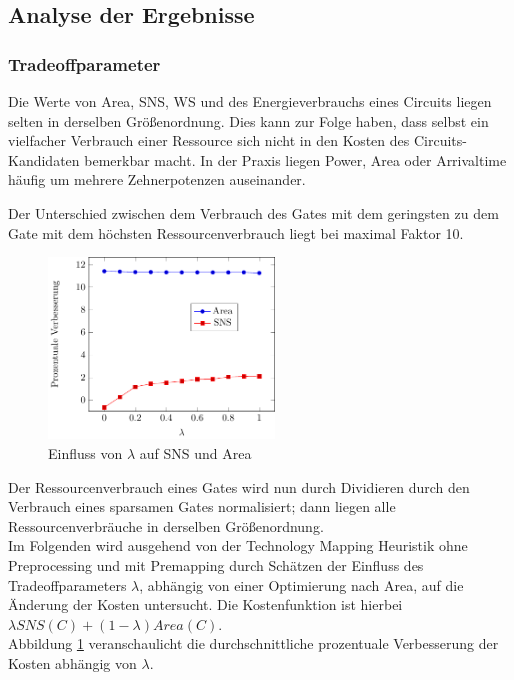 \documentclass[11pt, a4paper, german]{article}
\newcommand{\TM}{Technology  Mapping }
\begin{document}
 \subsection{Analyse der Ergebnisse}
 \label{subsec:analyse_der_ergebnisse}

\subsubsection{Tradeoffparameter}
Die Werte von Area, SNS, WS und des Energieverbrauchs eines Circuits liegen selten in derselben Größenordnung. Dies kann zur Folge haben, dass selbst ein vielfacher Verbrauch einer Ressource sich nicht in den Kosten des Circuits-Kandidaten bemerkbar macht. In der Praxis liegen Power, Area oder Arrivaltime häufig um mehrere Zehnerpotenzen auseinander. 

Der Unterschied zwischen dem Verbrauch des Gates mit dem geringsten zu dem Gate mit dem höchsten Ressourcenverbrauch liegt bei maximal Faktor 10.

\begin{figure}
		\includegraphics[width = 6cm]{pictures/tex_files/analysis/tradeoff_curve}
		\caption{Einfluss von $\lambda$ auf SNS und Area}
		\label{bild:tradeoff_test}
\end{figure} 
Der Ressourcenverbrauch eines Gates wird nun durch Dividieren durch den Verbrauch eines sparsamen Gates normalisiert; dann liegen alle Ressourcenverbräuche  in derselben Gr\"o{\ss}enordnung. \\
Im Folgenden wird ausgehend von der \TM Heuristik ohne Preprocessing und mit Premapping durch Sch\"atzen der Einfluss des Tradeoffparameters $\lambda$, abhängig von einer Optimierung nach Area,  auf die Änderung der Kosten untersucht.  Die Kostenfunktion ist hierbei $\lambda SNS(C) + (1-\lambda)Area(C)$.\\
Abbildung \ref{bild:tradeoff_test} veranschaulicht die durchschnittliche prozentuale Verbesserung der Kosten abhängig von $\lambda$.\\
\end{document}
